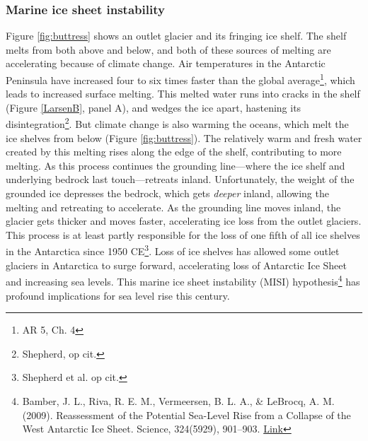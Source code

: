 \documentclass[amstex,12pt]{book}
\begin{document}
\subsubsection{Marine ice sheet instability} Figure \ref{fig:buttress} shows an outlet glacier and its fringing ice shelf. The shelf melts from both above and below, and both of these sources of melting are accelerating because of climate change. Air temperatures in the Antarctic Peninsula have increased four to six times faster than the global average\footnote{AR 5, Ch. 4}, which leads to increased surface melting. This melted water runs into cracks in the shelf (Figure \ref{LarsenB}, panel A), and wedges the ice apart, hastening its disintegration\footnote{Shepherd, op cit.}. But climate change is also warming the oceans, which melt the ice shelves from below (Figure \ref{fig:buttress}). The relatively warm and fresh water created by this melting rises along the edge of the shelf, contributing to more melting. As this process continues the grounding line---where the ice shelf and underlying bedrock last touch---retreats inland. Unfortunately, the weight of the grounded ice depresses the bedrock, which gets \emph{deeper} inland, allowing the melting and retreating to accelerate. As the grounding line moves inland, the glacier gets thicker and moves faster, accelerating ice loss from the outlet glaciers. This process is at least partly responsible for the loss of one fifth of all ice shelves in the Antarctica since 1950 CE\footnote{Shepherd et al. op cit.}. Loss of ice shelves has allowed some outlet glaciers in Antarctica to surge forward, accelerating loss of Antarctic Ice Sheet and increasing sea levels. This marine ice sheet instability (MISI) hypothesis\footnote{Bamber, J. L., Riva, R. E. M., Vermeersen, B. L. A., \& LeBrocq, A. M. (2009). Reassessment of the Potential Sea-Level Rise from a Collapse of the West Antarctic Ice Sheet. Science, 324(5929), 901–903. \href{https://doi.org/10.1126/science.1169335}{Link}} has profound implications for sea level rise this century.\\
\end{document}
